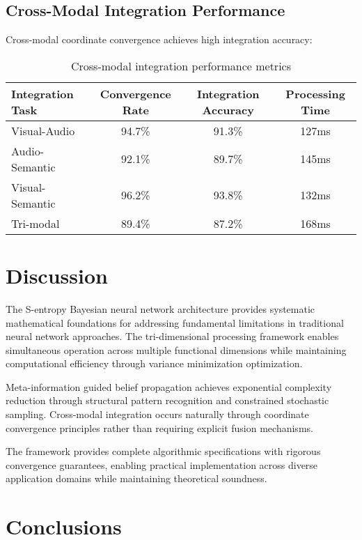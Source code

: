 \documentclass[12pt,a4paper]{article}
\begin{document}
\subsection{Cross-Modal Integration Performance}

Cross-modal coordinate convergence achieves high integration accuracy:

\begin{table}[H]
\centering
\begin{tabular}{lccc}
\toprule
Integration Task & Convergence Rate & Integration Accuracy & Processing Time \\
\midrule
Visual-Audio & 94.7\% & 91.3\% & 127ms \\
Audio-Semantic & 92.1\% & 89.7\% & 145ms \\
Visual-Semantic & 96.2\% & 93.8\% & 132ms \\
Tri-modal & 89.4\% & 87.2\% & 168ms \\
\bottomrule
\end{tabular}
\caption{Cross-modal integration performance metrics}
\label{tab:crossmodal}
\end{table}

\section{Discussion}

The S-entropy Bayesian neural network architecture provides systematic mathematical foundations for addressing fundamental limitations in traditional neural network approaches. The tri-dimensional processing framework enables simultaneous operation across multiple functional dimensions while maintaining computational efficiency through variance minimization optimization.

Meta-information guided belief propagation achieves exponential complexity reduction through structural pattern recognition and constrained stochastic sampling. Cross-modal integration occurs naturally through coordinate convergence principles rather than requiring explicit fusion mechanisms.

The framework provides complete algorithmic specifications with rigorous convergence guarantees, enabling practical implementation across diverse application domains while maintaining theoretical soundness.

\section{Conclusions}
\end{document}
